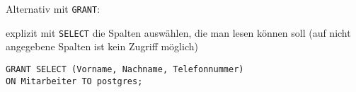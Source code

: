 \documentclass{lehramt-informatik-aufgabe}
\begin{document}
\begin{enumerate}
\begin{liAntwort}
Alternativ mit \verb|GRANT|:

explizit mit \verb|SELECT| die Spalten auswählen,
die man lesen können soll (auf nicht angegebene Spalten ist kein Zugriff
möglich)

\begin{verbatim}
GRANT SELECT (Vorname, Nachname, Telefonnummer)
ON Mitarbeiter TO postgres;
\end{verbatim}
\end{liAntwort}
\end{enumerate}
\end{document}
